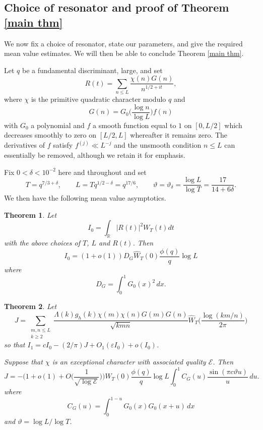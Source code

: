 \documentclass[12pt, oneside]{amsart}
\newtheorem{thm}{Theorem}
\theoremstyle{definition}
\newcommand{\mb}{\mathbb}
\newcommand{\mc}{\mathcal}
\newcommand{\leqs}{\leqslant }
\newcommand{\geqs}{\geqslant }
\newcommand{\wh}{\widehat}
\newcommand{\eps}{\varepsilon}
\newcommand{\1}{\mathds{1}}
\begin{document}
\subsection{Choice of resonator and proof of Theorem \ref{main thm}}
We now fix a choice of resonator, state our parameters, and give the required mean value estimates. We will then be able to conclude Theorem \ref{main thm}.

 Let $q$ be a fundamental discriminant, large, and set
\[
R(t)=\sum_{n\leqs L}\frac{\chi(n)G(n)}{n^{1/2+it}},
\]
where $\chi$ is the primitive quadratic character modulo $q$ and 
\[
G(n)=G_0\Big(\frac{\log n}{\log L}\Big)f(n)
\]
with $G_0$ a polynomial and $f$  a smooth function equal to $1$ on $[0,L/2]$ which decreases smoothly to zero on $[L/2,L]$ whereafter it remains zero. The derivatives of $f$  satisfy $f^{(j)}\ll L^{-j}$ and the unsmooth condition $n\leqs L$ can essentially be removed, although we retain it for emphasis. 

Fix $0<\delta<10^{-2}$ here and throughout and set
\begin{equation}
 T=q^{7/3+\delta},\qquad
 L=Tq^{1/2-\delta}=q^{17/6},\qquad
 \vartheta=\vartheta_\delta=\frac{\log L}{\log T}
 =\frac{17}{14+6\delta}.
 \label{eq:parameters}
\end{equation}
We then have the following mean value asymptotics. 

\begin{thm}
\label{denom thm}
Let 
\[
 I_0=\int_\mb{R} |R(t)|^2W_T(t)dt
\]
with the above choices of $T$, $L$ and $R(t)$. Then
\begin{equation}
 I_0=(1+o(1))D_G\wh W_T(0)\frac{\phi(q)}q\log L
 \label{eq:I0-asymptotic}
\end{equation}
where
\begin{equation}
 D_G=\int_0^1G_0(x)^2\,dx.
 \label{eq:DG}
\end{equation}
\end{thm}

\begin{thm}\label{num thm}
Let 
\[
J=\sum_{\substack{m,n\leqs L\\k\geqs 2}}\frac{\Lambda(k)g_h(k)\chi(m)\chi(n)G(m)G(n)}{\sqrt{kmn}}\wh W_T\Big(\frac{\log(km/n)}{2\pi}\Big)
\]
so that $I_1=cI_0-(2/\pi)J+O_1(\eps I_0)+o(I_0)$.


Suppose that $\chi$ is an exceptional character with associated quality $\mc{E}$. Then 
\[
J=-
\Big(1+o(1)+O\Big(\frac{1}{\sqrt{\log\mc{E}}}\Big)\Big)\wh W_T(0)\frac{\phi(q)}q\log L
 \int_0^1 C_G(u)
 \frac{\sin(\pi c\vartheta u)}u\,du.
\]
where 
\[ C_G(u)=\int_0^{1-u}G_0(x)G_0(x+u)\,dx\]
and $\vartheta=\log L/\log T$.
\end{thm}
\end{document}
